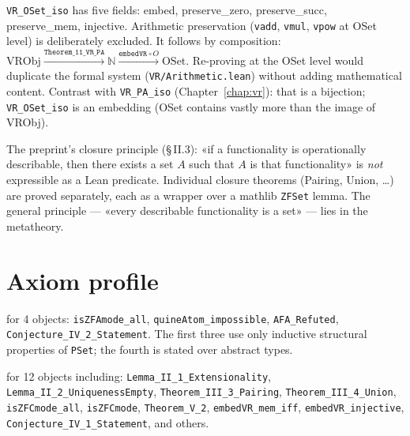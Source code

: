 \begin{remark}
\label{rem:D5_vr_oset_scope}
\leanok
{}
\texttt{VR\_OSet\_iso} has five fields: embed, preserve\_zero,
preserve\_succ, preserve\_mem, injective.  Arithmetic preservation
(\texttt{vadd}, \texttt{vmul}, \texttt{vpow} at OSet level) is
deliberately excluded.  It follows by composition:
$\mathrm{VRObj} \xrightarrow{\texttt{Theorem\_11\_VR\_PA}} \mathbb{N}
\xrightarrow{\texttt{embedVR} \circ O} \mathrm{OSet}$.
Re-proving at the OSet level would duplicate the formal system (\texttt{VR/Arithmetic.lean}) without adding
mathematical content.  Contrast with \texttt{VR\_PA\_iso} (Chapter~\ref{chap:vr}):
that is a bijection; \texttt{VR\_OSet\_iso} is an embedding (OSet
contains vastly more than the image of VRObj).
\end{remark}

\begin{remark}
\label{rem:D6_closure}
\leanok
{}
The preprint's closure principle (§\,II.3): «if a functionality is
operationally describable, then there exists a set $A$ such that $A$
is that functionality» is \emph{not} expressible as a Lean predicate.
Individual closure theorems (Pairing, Union, \ldots) are proved
separately, each as a wrapper over a mathlib \texttt{ZFSet} lemma.
The general principle --- «every describable functionality is a set»
--- lies in the metatheory.
\end{remark}

\section{Axiom profile}
\label{sec:sets_axiom_profile}

\axiomprofile{[]} for 4 objects:
\texttt{isZFAmode\_all}, \texttt{quineAtom\_impossible},
\texttt{AFA\_Refuted}, \texttt{Conjecture\_IV\_2\_Statement}.
The first three use only inductive structural properties of \texttt{PSet};
the fourth is stated over abstract types.

 for 12 objects including:
\texttt{Lemma\_II\_1\_Extensionality}, \texttt{Lemma\_II\_2\_UniquenessEmpty},
\texttt{Theorem\_III\_3\_Pairing}, \texttt{Theorem\_III\_4\_Union},
\texttt{isZFCmode\_all}, \texttt{isZFCmode}, \texttt{Theorem\_V\_2},
\texttt{embedVR\_mem\_iff}, \texttt{embedVR\_injective},
\texttt{Conjecture\_IV\_1\_Statement}, and others.

